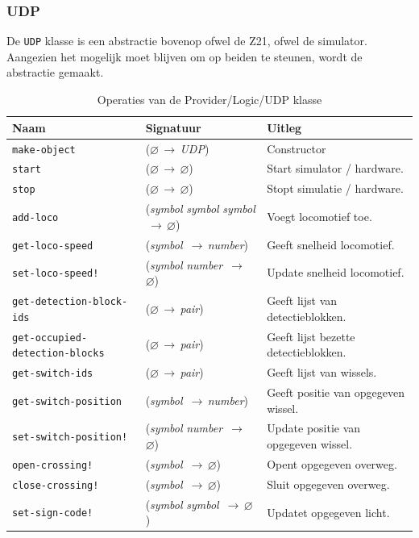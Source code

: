 \documentclass[a4paper, 11pt]{article}
\newcommand{\naar}{\,$\rightarrow$\,}
\renewcommand{\empty}{$\varnothing$}
\newcommand{\<}{\scriptsize\textless\normalsize}
\renewcommand{\>}{\scriptsize\textgreater\normalsize}
\begin{document}
\subsubsection{UDP} %
De \texttt{UDP} klasse is een abstractie bovenop ofwel de Z21, ofwel de simulator. Aangezien het mogelijk moet blijven om op beiden te steunen, wordt de abstractie gemaakt.
\begin{table}[H]
	\begin{center}
		\begin{tabular}{|l l l|}
			\hline
			\textbf{Naam} & \textbf{Signatuur} & \textbf{Uitleg}\\
			\hline
			\texttt{make-object} & (\empty \naar \textit{UDP}) & Constructor\\
			\hline
			\texttt{start} & (\empty \naar \empty) & Start simulator / hardware.\\
			\texttt{stop} & (\empty \naar \empty) & Stopt simulatie / hardware.\\
			\texttt{add-loco} & (\textit{symbol} \textit{symbol} \textit{symbol} \naar \empty) & Voegt locomotief toe.\\
			\texttt{get-loco-speed} & (\textit{symbol} \naar \textit{number}) & Geeft snelheid locomotief.\\
			\texttt{set-loco-speed!} & (\textit{symbol} \textit{number} \naar \empty) & Update snelheid locomotief.\\
			\texttt{get-detection-block-ids} & (\empty \naar \textit{pair}) & Geeft lijst van detectieblokken.\\
			\texttt{get-occupied-detection-blocks} & (\empty \naar \textit{pair}) & Geeft lijst bezette detectieblokken.\\
			\texttt{get-switch-ids} & (\empty \naar \textit{pair}) & Geeft lijst van wissels.\\
			\texttt{get-switch-position} & (\textit{symbol} \naar \textit{number}) & Geeft positie van opgegeven wissel.\\
			\texttt{set-switch-position!} & (\textit{symbol} \textit{number} \naar \empty) & Update positie van opgegeven wissel.\\
			\texttt{open-crossing!} & (\textit{symbol} \naar \empty) & Opent opgegeven overweg.\\
			\texttt{close-crossing!} & (\textit{symbol} \naar \empty) & Sluit opgegeven overweg.\\
			\texttt{set-sign-code!} & (\textit{symbol} \textit{symbol} \naar \empty) & Updatet opgegeven licht.\\
			\hline
		\end{tabular}
		\caption{Operaties van de Provider/Logic/UDP klasse}
	\end{center}
\end{table}
\end{document}
